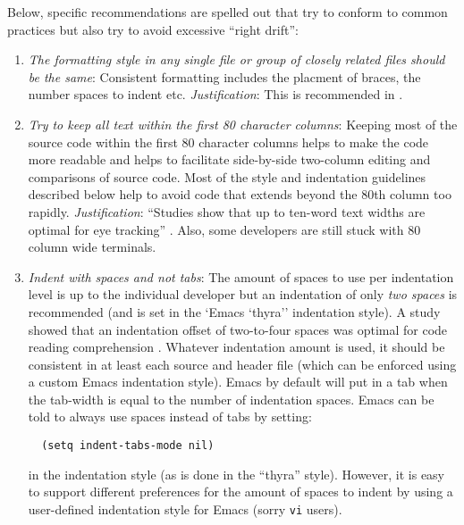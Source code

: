 Below, specific recommendations are spelled out that try to conform to common
practices but also try to avoid excessive ``right drift'':

\begin{enumerate}

{}\item\textit{The formatting style in any single file or group of closely
related files should be the same}: Consistent formatting includes the placment
of braces, the number spaces to indent etc.  {}\textit{Justification}: This is
recommended in {}\cite[Item 0]{C++CodingStandards05}.

{}\item\textit{Try to keep all text within the first 80 character columns}:
Keeping most of the source code within the first 80 character columns helps to
make the code more readable and helps to facilitate side-by-side two-column
editing and comparisons of source code.  Most of the style and indentation
guidelines described below help to avoid code that extends beyond the 80th
column too rapidly. {}\textit{Justification}: ``Studies show that up to
ten-word text widths are optimal for eye tracking'' {}\cite[Item
0]{C++CodingStandards05}.  Also, some developers are still stuck with 80
column wide terminals.

{}\item\textit{Indent with spaces and not tabs}: The amount of spaces to use
per indentation level is up to the individual developer but an indentation of
only {}\textit{two spaces} is recommended (and is set in the `Emacs `thyra''
indentation style).  A study showed that an indentation offset of two-to-four
spaces was optimal for code reading comprehension {}\cite[Section
31.2]{CodeComplete2nd04}.  Whatever indentation amount is used, it should be
consistent in at least each source and header file {}\cite[Item
0]{C++CodingStandards05} (which can be enforced using a custom Emacs
indentation style).  Emacs by default will put in a tab when the tab-width is
equal to the number of indentation spaces.  Emacs can be told to always use
spaces instead of tabs by setting:

{\small\begin{verbatim}
  (setq indent-tabs-mode nil)
\end{verbatim}}

in the indentation style (as is done in the ``thyra'' style).  However, it is
easy to support different preferences for the amount of spaces to indent by
using a user-defined indentation style for Emacs (sorry {}\texttt{vi} users).


\end{enumerate}
